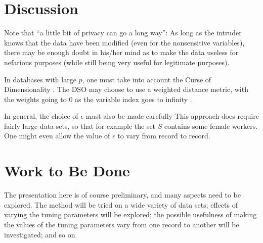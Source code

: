\documentclass[11pt]{article}
\begin{document}
\section{Discussion}

Note that ``a little bit of privacy can go a long way'':  As long as the
intruder knows that the data have been modified (even for the
nonsensitive variables), there may be enough doubt in his/her mind as to
make the data useless for nefarious purposes (while still being very
useful for legitimate purposes).

In databases with large $p$, one must take into account the Curse of
Dimensionality \cite{beyer}.  The DSO may choose to use a weighted
distance metric, with the weights going to 0 as the variable index goes
to infinity \cite{matloff2015}.

In general, the choice of $\epsilon$ must also be made carefully
This approach does require fairly large data sets, so that for example
the set $S$ contains some female workers.  One might even allow the
value of $\epsilon$ to vary from record to record.

\section{Work to Be Done}

The presentation here is of course preliminary, and many aspects need to
be explored.  The method will be tried on a wide variety of data sets;
effects of varying the tuning parameters will be explored; the possible
usefulness of making the values of the tuning parameters vary from one
record to another will be investigated; and so on.
\end{document}
